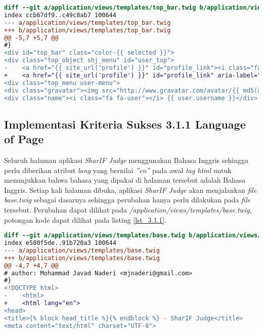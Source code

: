 \begin{itemize}
\begin{lstlisting}[language=diff, caption=Perubahan untuk mematuhi kriteria 2.4.4, label=lst_2.4.4, basicstyle=\ttfamily, frame=single,
columns=fullflexible, keepspaces=true, breaklines=true]
diff --git a/application/views/templates/top_bar.twig b/application/views/templates/top_bar.twig
index ccb67df9..c49c8ab7 100644
--- a/application/views/templates/top_bar.twig
+++ b/application/views/templates/top_bar.twig
@@ -5,7 +5,7 @@
#}
<div id="top_bar" class="color-{{ selected }}">
<div class="top_object shj_menu" id="user_top">
-    <a href="{{ site_url('profile') }}" id="profile_link"><i class="fa fa-user"></i></a>
+    <a href="{{ site_url('profile') }}" id="profile_link" aria-label="Profile"><i class="fa fa-user"></i></a>
<div class="top_menu user-menu">
<div class="gravatar"><img src="http://www.gravatar.com/avatar/{{ md5(user.email) }}?s=70&d=identicon" /></div>
<div class="name"><i class="fa fa-user"></i> {{ user.username }}</div>
\end{lstlisting}

\end{itemize}

\subsection{Implementasi Kriteria Sukses 3.1.1 Language of Page}
\label{subsec:implementasi_A_3.1.1}

Seluruh halaman aplikasi \textit{SharIF Judge} menggunakan Bahasa Inggris sehingga perlu diberikan atribut \textit{lang} yang bernilai \textit{''en''} pada awal \textit{tag html} untuk menunjukkan bahwa bahasa yang dipakai di halaman tersebut adalah Bahasa Inggris. Setiap kali halaman dibuka, aplikasi \textit{SharIF Judge} akan menjalankan \textit{file} \textit{base.twig} sebagai dasarnya sehingga perubahan hanya perlu dilakukan pada \textit{file} tersebut. Perubahan dapat dilihat pada \textit{/application/views/templates/base.twig}, potongan kode dapat dilihat pada listing \ref{lst_3.1.1}.

\begin{lstlisting}[language=diff, caption=Perubahan untuk mematuhi kriteria 3.1.1, label=lst_3.1.1, basicstyle=\ttfamily, frame=single,
columns=fullflexible, keepspaces=true, breaklines=true]
diff --git a/application/views/templates/base.twig b/application/views/templates/base.twig
index e580f5de..91b720a3 100644
--- a/application/views/templates/base.twig
+++ b/application/views/templates/base.twig
@@ -4,7 +4,7 @@
# author: Mohammad Javad Naderi <mjnaderi@gmail.com>
#}
<!DOCTYPE html>
-    <html>
+    <html lang="en">
<head>
<title>{% block head_title %}{% endblock %} - SharIF Judge</title>
<meta content="text/html" charset="UTF-8">
\end{lstlisting}

